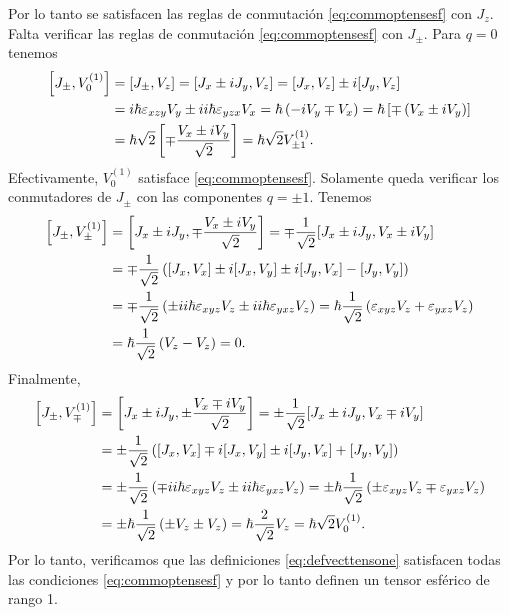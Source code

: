 \documentclass[10pt, a4paper]{article}
\numberwithin{equation}{subsection}
\begin{document}
Por lo tanto se satisfacen las reglas de conmutación \eqref{eq:commoptensesf}
con $J_z$. Falta verificar las reglas de conmutación \eqref{eq:commoptensesf}
con $J_\pm$. Para $q = 0$ tenemos
\begin{align}
  \comm{J_{\pm}}{V^{(1)}_{0}} &= \comm{J_{\pm}}{V_z} = \comm{J_x \pm iJ_y}{V_z}
    = \comm{J_x}{V_z} \pm i\comm{J_y}{V_z} \nonumber \\
  &= i\hbar\lchivita_{xzy}V_y \pm ii\hbar\lchivita_{yzx}V_x
    = \hbar\left(-iV_y \mp V_x\right)
    = \hbar\left[\mp\left(V_x \pm iV_y\right)\right] \nonumber \\
  &= \hbar\sqrt{2}\left[\mp\frac{V_x \pm iV_y}{\sqrt{2}}\right]
    = \hbar\sqrt{2}V^{(1)}_{\pm1}.
\end{align}
Efectivamente, $V^{(1)}_{0}$ satisface \eqref{eq:commoptensesf}. Solamente
queda verificar los conmutadores de $J_\pm$ con las componentes $q = \pm 1$.
Tenemos
\begin{align}
  \comm{J_\pm}{V^{(1)}_\pm} &= \comm{J_x \pm iJ_y}{\mp\frac{V_x \pm
    iV_y}{\sqrt{2}}} = \mp\frac{1}{\sqrt{2}}\comm{J_x \pm iJ_y}{V_x \pm iV_y}
    \nonumber \\
  &= \mp\frac{1}{\sqrt{2}}\left(\comm{J_x}{V_x} \pm i\comm{J_x}{V_y} \pm
    i\comm{J_y}{V_x} - \comm{J_y}{V_y}\right) \nonumber \\
  &= \mp\frac{1}{\sqrt{2}}\left(\pm ii\hbar\lchivita_{xyz}V_z \pm
    ii\hbar\lchivita_{yxz}V_z\right)
    = \hbar\frac{1}{\sqrt{2}}\left(\lchivita_{xyz}V_z +
    \lchivita_{yxz}V_z\right) \nonumber \\
  &= \hbar\frac{1}{\sqrt{2}}\left(V_z - V_z\right) = 0.
\end{align}
Finalmente,
\begin{align}
  \comm{J_\pm}{V^{(1)}_\mp} &= \comm{J_x \pm iJ_y}{\pm\frac{V_x \mp
    iV_y}{\sqrt{2}}} = \pm\frac{1}{\sqrt{2}}\comm{J_x \pm iJ_y}{V_x \mp iV_y}
    \nonumber \\
  &= \pm\frac{1}{\sqrt{2}}\left(\comm{J_x}{V_x} \mp i\comm{J_x}{V_y} \pm
    i\comm{J_y}{V_x} + \comm{J_y}{V_y}\right) \nonumber \\
  &= \pm\frac{1}{\sqrt{2}}\left(\mp ii\hbar\lchivita_{xyz}V_z \pm
    ii\hbar\lchivita_{yxz}V_z\right)
    = \pm\hbar\frac{1}{\sqrt{2}}\left(\pm\lchivita_{xyz}V_z
    \mp\lchivita_{yxz}V_z\right) \nonumber \\
  &= \pm\hbar\frac{1}{\sqrt{2}}\left(\pm V_z \pm V_z\right)
    = \hbar \frac{2}{\sqrt{2}}V_z = \hbar\sqrt{2}V^{(1)}_{0}.
\end{align}
Por lo tanto, verificamos que las definiciones \eqref{eq:defvecttensone}
satisfacen todas las condiciones \eqref{eq:commoptensesf} y por lo tanto
definen un tensor esférico de rango 1.
\end{document}
